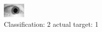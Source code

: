 \begin{figure}[h!]
\begin{center}
\includegraphics[width=0.60\columnwidth]{figures/ID1569_class_2_target_1.png}
\end{center}
\caption{ Classification: 2 actual target: 1}
\label{fig:ID1569_class_2_target_1}
\end{figure}
